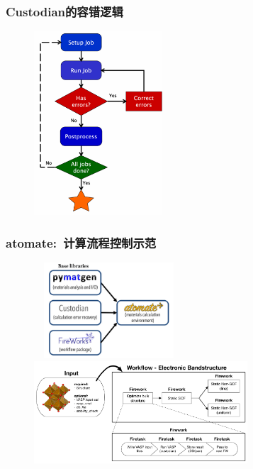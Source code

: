 \frame
{
	\frametitle{\textrm{Custodian}的容错逻辑}
\begin{figure}[h!]
\centering
\vspace*{-0.1in}
\includegraphics[height=2.7in]{Figures/MP_custodian.png}
\label{Custodian_over}
\caption{\fontsize{7.2pt}{4.2pt}}%
\end{figure} 
}

\frame
{
	\frametitle{\textrm{atomate}:~计算流程控制示范}
\begin{figure}[h!]
\centering
\vspace*{-0.19in}
\includegraphics[height=1.4in,width=2.2in,viewport=0 0 820 630,clip]{Figures/Atomate_comp.png}
\vskip 1pt
\includegraphics[height=1.5in]{Figures/bandstructure_wf.png}
\label{Logo_QM-MM}
\end{figure} 
}

